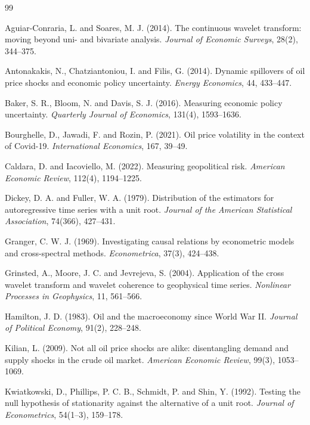 \documentclass[11pt,a4paper]{article}
\begin{document}
\begin{thebibliography}{99}
\setlength{\itemsep}{1pt}\small

Aguiar-Conraria, L. and Soares, M. J. (2014). The continuous wavelet transform:
moving beyond uni- and bivariate analysis. \emph{Journal of Economic Surveys},
28(2), 344--375.

Antonakakis, N., Chatziantoniou, I. and Filis, G. (2014). Dynamic spillovers of
oil price shocks and economic policy uncertainty. \emph{Energy Economics}, 44,
433--447.

Baker, S. R., Bloom, N. and Davis, S. J. (2016). Measuring economic policy
uncertainty. \emph{Quarterly Journal of Economics}, 131(4), 1593--1636.

Bourghelle, D., Jawadi, F. and Rozin, P. (2021). Oil price volatility in the
context of Covid-19. \emph{International Economics}, 167, 39--49.

Caldara, D. and Iacoviello, M. (2022). Measuring geopolitical risk.
\emph{American Economic Review}, 112(4), 1194--1225.

Dickey, D. A. and Fuller, W. A. (1979). Distribution of the estimators for
autoregressive time series with a unit root. \emph{Journal of the American
Statistical Association}, 74(366), 427--431.

Granger, C. W. J. (1969). Investigating causal relations by econometric models
and cross-spectral methods. \emph{Econometrica}, 37(3), 424--438.

Grinsted, A., Moore, J. C. and Jevrejeva, S. (2004). Application of the cross
wavelet transform and wavelet coherence to geophysical time series.
\emph{Nonlinear Processes in Geophysics}, 11, 561--566.

Hamilton, J. D. (1983). Oil and the macroeconomy since World War II.
\emph{Journal of Political Economy}, 91(2), 228--248.

Kilian, L. (2009). Not all oil price shocks are alike: disentangling demand and
supply shocks in the crude oil market. \emph{American Economic Review}, 99(3),
1053--1069.

Kwiatkowski, D., Phillips, P. C. B., Schmidt, P. and Shin, Y. (1992). Testing
the null hypothesis of stationarity against the alternative of a unit root.
\emph{Journal of Econometrics}, 54(1--3), 159--178.


\end{thebibliography}
\end{document}
